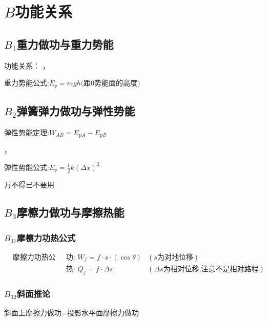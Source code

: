 \documentclass[lang=cn,10pt]{elegantbook}
\begin{document}
	           \section{$B$功能关系}
	           \subsection{$B_1$重力做功与重力势能}
	           功能关系：  ，
	           
	           
	          $ \text{重力势能公式:}E_{\mathfrak{p}}=mgh\text{(距}0\text{势能面的高度)}$
	          
	          \subsection{$B_2$弹簧弹力做功与弹性势能}
	          
	          $\text{弹性势能定理:}W_{AB}=E_{\mathrm{p}A}-E_{\mathrm{p}B}$
	          
	          ，
	          
	          $\text{弹性势能公式:}E_{\mathfrak{p}}=\frac12k(\Delta x)^2$
	          
	         \begin{remark}
	         	万不得已不要用
	         \end{remark}
	         
	         
	         \subsection{$B_3$摩檫力做功与摩擦热能}
	         \subsubsection{$B_{31}$摩檫力功热公式}
	         $\begin{aligned}&\text{摩擦力功热公式}&\text{功: }W_f=f\cdot s\cdot(\cos\theta)&(s\text{为对地位移})\\&&\text{热: }Q_f=f\cdot\Delta s&(\Delta s\text{为相对位移,注意不是相对路程})\end{aligned}$
	         
	         \subsubsection{$B_{32}$斜面推论}
	         $\text{斜面上摩擦力做功=投影水平面摩擦力做功}$
	         
\end{document}
